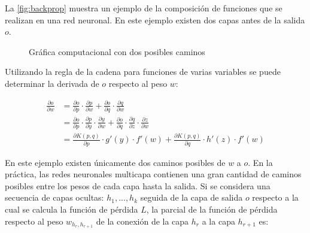 La \autoref{fig:backprop} muestra un ejemplo de la composición de funciones que se realizan en una red neuronal. En este ejemplo existen dos capas antes de la salida $o$.

\begin{figure}[h]
  \centering
\caption{Gráfica computacional con dos posibles caminos \cite{Nielsen:2018}}
\label{fig:backprop}
\end{figure}

Utilizando la regla de la cadena para funciones de varias variables se puede determinar la derivada de $o$ respecto al peso $w$:

\begin{align}
  \label{eq:ugly}
\frac{\partial o}{\partial w} &= \frac{\partial o}{\partial p} \cdot \frac{\partial p}{\partial w} +  \frac{\partial o}{\partial q} \cdot \frac{\partial q}{\partial w}  \\ 
                              &=  \frac{\partial o}{\partial p}\cdot\frac{\partial p}{\partial y}\cdot\frac{\partial y}{\partial w} + \frac{\partial o}{\partial q}\cdot \frac{\partial q}{\partial z}\cdot \frac{\partial z}{\partial w}\\
                              &= \frac{\partial K(p,q)}{\partial p}\cdot g'(y)\cdot f'(w) + \frac{\partial K(p,q)}{\partial q}\cdot h'(z)\cdot f'(w)
\end{align}

En este ejemplo existen únicamente dos caminos posibles de $w$ a $o$. En la práctica, las redes neuronales multicapa contienen una gran cantidad de caminos posibles entre los pesos de cada capa hasta la salida. Si se considera una secuencia de capas ocultas: $h_1,...,h_k$ seguida de la capa de salida $o$ respecto a la cual se calcula la función de pérdida $L$, la parcial de la función de pérdida respecto al peso $w_{h_r, h_{r+1}}$ de la conexión de la capa $h_{r}$ a la capa $h_{r+1}$ es: \cite{Nielsen:2018}

